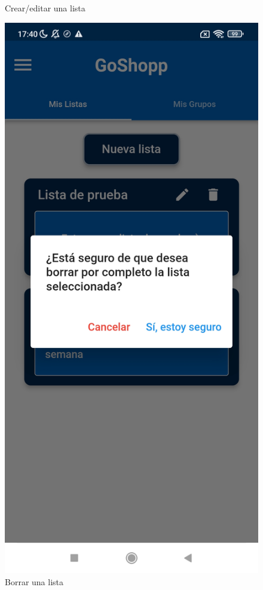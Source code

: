 \documentclass{article}
\begin{document}
\begin{figure}[h]
\begin{minipage}[h]{0.33\textwidth}
        \caption{Crear/editar una lista}
    \end{minipage}
    \hspace{1cm}
    \begin{minipage}[h]{0.33\textwidth}
        \includegraphics[width=\textwidth]{imagenes/pantallas/listas/modal_borrar_lista.jpg}
        \caption{Borrar una lista}
    \end{minipage}
\end{figure}
\end{document}
